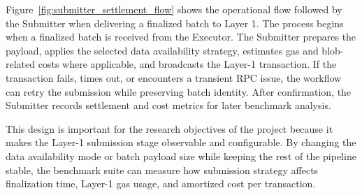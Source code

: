 Figure~\ref{fig:submitter_settlement_flow} shows the operational flow followed by the Submitter when delivering a finalized batch to Layer 1. The process begins when a finalized batch is received from the Executor. The Submitter prepares the payload, applies the selected data availability strategy, estimates gas and blob-related costs where applicable, and broadcasts the Layer-1 transaction. If the transaction fails, times out, or encounters a transient RPC issue, the workflow can retry the submission while preserving batch identity. After confirmation, the Submitter records settlement and cost metrics for later benchmark analysis.

This design is important for the research objectives of the project because it makes the Layer-1 submission stage observable and configurable. By changing the data availability mode or batch payload size while keeping the rest of the pipeline stable, the benchmark suite can measure how submission strategy affects finalization time, Layer-1 gas usage, and amortized cost per transaction.


